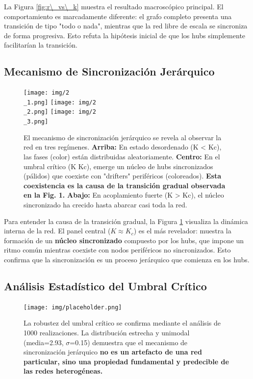 \documentclass[12pt, a4paper]{article}
\begin{document}
La Figura \ref{fig:r\_vs\_k} muestra el resultado macroscópico principal. El comportamiento es marcadamente diferente: el grafo completo presenta una transición de tipo "todo o nada", mientras que la red libre de escala se sincroniza de forma progresiva. Esto refuta la hipótesis inicial de que los hubs simplemente facilitarían la transición.

\subsection{Mecanismo de Sincronización Jerárquico}
\begin{figure}[H]
    \centering
    \texttt{[image: img/2\\\_1.png]}
    \texttt{[image: img/2\\\_2.png]}
    \texttt{[image: img/2\\\_3.png]}
    \caption{El mecanismo de sincronización jerárquico se revela al observar la red en tres regímenes. \textbf{Arriba:} En estado desordenado (K < Kc), las fases (color) están distribuidas aleatoriamente. \textbf{Centro:} En el umbral crítico (K \approx Kc), emerge un núcleo de hubs sincronizados (pálidos) que coexiste con "drifters" periféricos (coloreados). \textbf{Esta coexistencia es la causa de la transición gradual observada en la Fig. 1.} \textbf{Abajo:} En acoplamiento fuerte (K > Kc), el núcleo sincronizado ha crecido hasta abarcar casi toda la red.}
    \label{fig:mecanismo}
\end{figure}

Para entender la causa de la transición gradual, la Figura \ref{fig:mecanismo} visualiza la dinámica interna de la red. El panel central (\(K \approx K_c\)) es el más revelador: muestra la formación de un \textbf{núcleo sincronizado} compuesto por los hubs, que impone un ritmo común mientras coexiste con nodos periféricos no sincronizados. Esto confirma que la sincronización es un proceso jerárquico que comienza en los hubs.

\subsection{Análisis Estadístico del Umbral Crítico}
\begin{figure}[H]
    \centering
    \texttt{[image: img/placeholder.png]} 
    \caption{La robustez del umbral crítico se confirma mediante el análisis de 1000 realizaciones. La distribución estrecha y unimodal (media=2.93, \(\sigma\)=0.15) demuestra que el mecanismo de sincronización jerárquico \textbf{no es un artefacto de una red particular, sino una propiedad fundamental y predecible de las redes heterogéneas.}}
    \label{fig:kc\_hist}
\end{figure}
\end{document}
